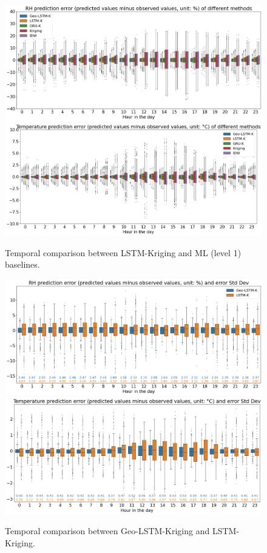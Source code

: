 \documentclass[a4paper,fleqn]{cas-sc}
\begin{document}
\begin{figure}[!h]
	\centering
        	\includegraphics[width=450pt]{figs/new_figs/RH5models.png}
	    \includegraphics[width=450pt]{figs/new_figs/Tem5models.png}
	\caption{Temporal comparison between LSTM-Kriging and ML (level 1) baselines.}
	\label{FIG:baselines1}
\end{figure}

\begin{figure}[!h]
	\centering
	\includegraphics[width=450pt]{figs/new_figs/RHerrstd.png}
    \includegraphics[width=450pt]{figs/new_figs/temerrstd.png}
	\caption{Temporal comparison between Geo-LSTM-Kriging and LSTM-Kriging.}
	\label{FIG:baselines3}
\end{figure}
\end{document}
